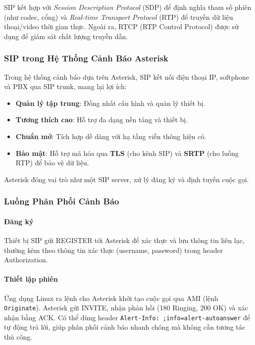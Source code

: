 SIP kết hợp với \textit{Session Description Protocol} (SDP) để định nghĩa tham số phiên (như codec, cổng) và \textit{Real-time Transport Protocol} (RTP) để truyền dữ liệu thoại/video thời gian thực. Ngoài ra, RTCP (RTP Control Protocol) được sử dụng để giám sát chất lượng truyền dẫn.

\subsubsection{SIP trong Hệ Thống Cảnh Báo Asterisk}
\label{subsubsec:sip_asterisk_integration}

Trong hệ thống cảnh báo dựa trên Asterisk, SIP kết nối điện thoại IP, softphone và PBX qua SIP trunk, mang lại lợi ích:

\begin{itemize}
\item \textbf{Quản lý tập trung}: Đồng nhất cấu hình và quản lý thiết bị.
\item \textbf{Tương thích cao}: Hỗ trợ đa dạng nền tảng và thiết bị.
\item \textbf{Chuẩn mở}: Tích hợp dễ dàng với hạ tầng viễn thông hiện có.
\item \textbf{Bảo mật}: Hỗ trợ mã hóa qua \textbf{TLS} (cho kênh SIP) và \textbf{SRTP} (cho luồng RTP) để bảo vệ dữ liệu.
\end{itemize}

Asterisk đóng vai trò như một SIP server, xử lý đăng ký và định tuyến cuộc gọi.

\subsubsection{Luồng Phân Phối Cảnh Báo}
\label{subsubsec:sip_alert_flows}

\paragraph{Đăng ký}
Thiết bị SIP gửi REGISTER tới Asterisk để xác thực và lưu thông tin liên lạc, thường kèm theo thông tin xác thực (username, password) trong header Authorization.

\paragraph{Thiết lập phiên}
Ứng dụng Linux ra lệnh cho Asterisk khởi tạo cuộc gọi qua AMI (lệnh \texttt{Originate}). Asterisk gửi INVITE, nhận phản hồi (180 Ringing, 200 OK) và xác nhận bằng ACK. Có thể dùng header \texttt{Alert-Info: ;info=alert-autoanswer} để tự động trả lời, giúp phân phối cảnh báo nhanh chóng mà không cần tương tác thủ công.


